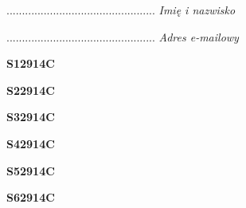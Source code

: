 \begin{turn}{90}\begin{minipage}{\linewidth} \vspace{20mm} ................................................  \textit{Imię i nazwisko}\end{minipage}\end{turn}

\begin{turn}{90}\begin{minipage}{\linewidth} \vspace{20mm} ................................................  \textit{Adres e-mailowy}\end{minipage}\end{turn}

\begin{turn}{90}\huge \begin{minipage}{\linewidth} \vspace{10mm}\textbf{S12914C}\end{minipage}\end{turn}

\begin{turn}{90}\huge \begin{minipage}{\linewidth} \vspace{10mm}\textbf{S22914C}\end{minipage}\end{turn}

\begin{turn}{90}\huge \begin{minipage}{\linewidth} \vspace{10mm}\textbf{S32914C}\end{minipage}\end{turn}

\begin{turn}{90}\huge \begin{minipage}{\linewidth} \vspace{10mm}\textbf{S42914C}\end{minipage}\end{turn}

\begin{turn}{90}\huge \begin{minipage}{\linewidth} \vspace{10mm}\textbf{S52914C}\end{minipage}\end{turn}

\begin{turn}{90}\huge \begin{minipage}{\linewidth} \vspace{10mm}\textbf{S62914C}\end{minipage}\end{turn}

